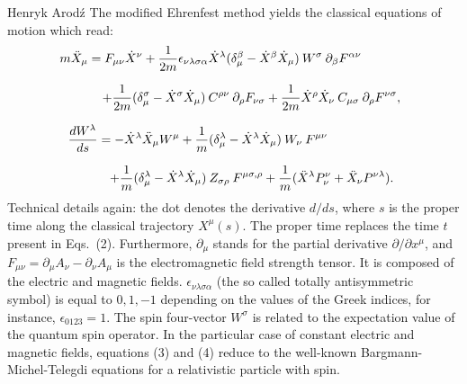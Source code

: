 \begin{artengenv}{Henryk Arod\'z}
The modified Ehrenfest method yields the classical equations of motion which read: 
\[\hspace*{-1.3cm} m \ddot{X}_{\mu} = F_{\mu\nu}\dot{X}^{\nu}+ \frac{1}{2m} \epsilon_{\nu\lambda\sigma\alpha}\dot{X}^{\lambda} (\delta^{\beta}_{\mu}- \dot{X}^{\beta} \dot{X}_{\mu}) \:W^{\sigma} \:\partial_{\beta}F^{\alpha\nu} \] 

\vspace*{-0.7cm}
\begin{equation} \hspace*{1.0cm} + \frac{1}{2m} (\delta^{\sigma}_{\mu}- \dot{X}^{\sigma} \dot{X}_{\mu}) \:C^{\rho\nu}\: \partial_{\rho}F_{\nu\sigma} + \frac{1}{2m} \dot{X}^{\rho} \dot{X}_{\nu} \: C_{\mu\sigma}\:\partial_{\rho} F^{\nu\sigma}, \end{equation}

\vspace*{-0.4cm}
\[ \frac{dW^{\lambda}}{ds} = - \dot{X}^{\lambda} \ddot{X}_{\mu}W^{\mu} + \frac{1}{m} (\delta^{\lambda}_{\mu}- \dot{X}^{\lambda} \dot{X}_{\mu}) \:W_{\nu}\:F^{\mu\nu} \hspace*{2cm} \] 

\vspace*{-1cm}
 \begin{equation} \hspace*{1cm} + \frac{1}{m} (\delta^{\lambda}_{\mu}- \dot{X}^{\lambda} \dot{X}_{\mu})\:Z_{\sigma \rho}\: F^{\mu\sigma,\rho} + \frac{1}{m} (\ddot{X}^{\lambda} P^{\nu}_{\nu} + \ddot{X}_{\nu}P^{\nu\lambda}). \end{equation}
Technical details again: the dot denotes the derivative $d/ ds$, where $s$ is the proper time along the classical trajectory $X^{\mu}(s)$. The proper time replaces the time $t$ present in Eqs.\ (2). Furthermore, $\partial_{\mu}$ stands for the partial derivative $\partial/ \partial x^{\mu}$, and 
$F_{\mu\nu} = \partial_{\mu} A_{\nu} - \partial_{\nu} A_{\mu} $ is the electromagnetic field strength tensor. It is composed of the electric and magnetic fields. $\epsilon_{\nu\lambda \sigma \alpha}$ (the so called totally antisymmetric symbol) is equal to $0, 1, -1$ depending on the values of the Greek indices, for instance, $\epsilon_{0123} =1$. 
The spin four-vector $ W^{\sigma}$ is related to the expectation value of the quantum spin operator. In the particular case of constant electric and magnetic fields, equations (3) and (4) reduce to the well-known Bargmann-Michel-Telegdi equations for a relativistic particle with spin. 

 


\end{artengenv}
